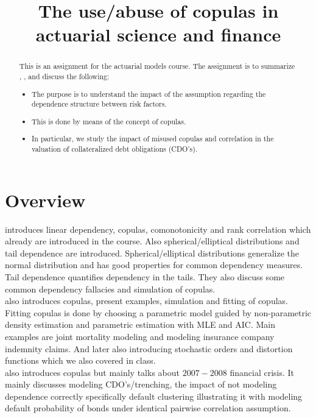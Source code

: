 \documentclass[a4paper,12pt]{article}
\title{The use/abuse of copulas in actuarial science and finance}
\date{}
\begin{document}
\maketitle

\begin{abstract}
    This is an assignment for the actuarial models course.
    The assignment is to summarize \cite{dempster_correlation_2002}, \cite{frees_understanding_1998},
    \cite{donnelly_devil_nodate} and discuss the following:

    \begin{itemize}
        \item  The purpose is to understand the impact of the assumption regarding
              the dependence structure between risk factors.
        \item  This is done by means of the concept of copulas.
        \item  In particular, we study the impact of misused copulas and correlation in the
              valuation of collateralized debt obligations (CDO's).
    \end{itemize}

\end{abstract}

\section{Overview}
\cite{dempster_correlation_2002} introduces linear dependency, copulas, comonotonicity and rank correlation which
already are introduced in the course. Also spherical/elliptical distributions and tail dependence are introduced.
Spherical/elliptical distributions generalize the normal distribution and has good properties for common dependency
measures.  Tail dependence quantifies dependency in the tails. They also discuss some
common dependency fallacies and simulation of copulas.\\

\cite{frees_understanding_1998} also introduces copulas, present examples, simulation
and fitting of copulas. Fitting copulas is done by choosing a parametric model
guided by non-parametric density estimation and parametric estimation
with MLE and AIC.
Main examples are joint mortality modeling and modeling insurance company indemnity claims.
And later also introducing stochastic orders and distortion functions which we also covered in class. \\

\cite{donnelly_devil_nodate} also introduces copulas but mainly talks about $2007-2008$ financial crisis.
It mainly discusses modeling CDO's/trenching, the impact of not modeling dependence correctly specifically default
clustering illustrating it with modeling default probability of bonds under identical pairwise correlation
assumption.
\end{document}
